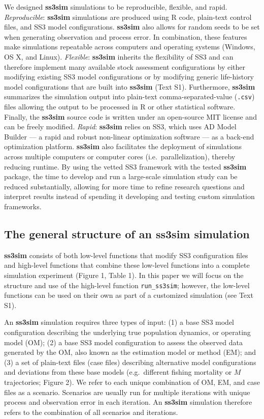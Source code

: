 \documentclass[10pt]{article}
\newcommand{\R}[1]{\label{#1}\linelabel{#1}}
\begin{document}
\R{B3:3}We designed \textbf{ss3sim} \R{B13}simulations to be reproducible,
flexible, and rapid. \emph{Reproducible}: \textbf{ss3sim} simulations are
produced using \textsf{R} code, plain-text control files, and SS3 model
configurations. \textbf{ss3sim} also allows for random seeds to be set when
generating observation and process error. In combination, these features make
simulations repeatable across computers and operating systems (Windows, OS X,
and Linux). \emph{Flexible}: \textbf{ss3sim} inherits the flexibility of SS3
and can therefore implement many available stock assessment configurations by
either modifying existing SS3 model configurations or by modifying generic
life-history model configurations that are built into \textbf{ss3sim} (Text
S1). Furthermore, \textbf{ss3sim} summarizes the simulation output into
plain-text comma-separated-value (\texttt{.csv}) files allowing the output to
be processed in \textsf{R} or other statistical software. Finally, the
\textbf{ss3sim} source code is written under an open-source MIT license and can
be freely modified. \emph{Rapid}: \textbf{ss3sim} relies on SS3, which uses AD
Model \R{B14}Builder \cite{fournier2012} --- \R{B15}a rapid and robust
non-linear optimization software \cite{bolker2013} --- as a back-end
optimization platform. \textbf{ss3sim} also facilitates the deployment of
simulations across multiple computers or computer cores (i.e.~parallelization),
thereby \R{B16}reducing runtime. By using the vetted SS3 framework with the
tested \textbf{ss3sim} package, the time to develop and run a large-scale
simulation study can be reduced substantially, \R{B17}allowing for more time to
refine research questions and interpret results instead of spending it
developing and testing custom simulation frameworks.

\subsection*{The general structure of an ss3sim simulation}

\textbf{ss3sim} consists of both low-level functions that modify SS3
configuration files and high-level functions that combine these low-level
functions into a complete simulation experiment (Figure 1, Table 1). In this
paper we will focus on the structure and use of the high-level function
\texttt{run\_ss3sim}; however, the low-level functions can be used on their own
as part of a customized simulation \R{B18}(see Text S1).

An \textbf{ss3sim} simulation requires three types of input: (1) a base SS3
model configuration describing the underlying true population dynamics, or
operating model (OM); (2) a base SS3 model configuration to assess the observed
data generated by the OM, also known as the estimation model or method (EM);
and (3) a set of plain-text files (case files) describing alternative model
configurations and deviations from these base models (e.g.~different fishing
mortality or $M$ trajectories; \R{B21:1}Figure 2). We refer to each unique
combination of OM, EM, and case files as a scenario. Scenarios are usually run
for multiple iterations with unique process and observation error in each
iteration. An \textbf{ss3sim} simulation therefore refers to the combination of
all scenarios and iterations.
\end{document}
